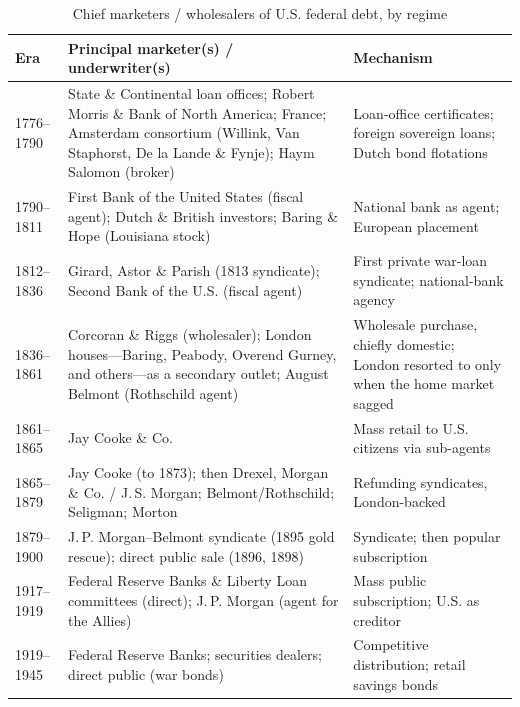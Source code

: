 \documentclass[12pt]{article}
\begin{document}
\begin{table}[htbp]
\centering
\caption{Chief marketers / wholesalers of U.S. federal debt, by regime}
\label{tab:marketers}
\small
\begin{tabular}{p{2.5cm} p{6.5cm} p{4.5cm}}
\toprule
Era & Principal marketer(s) / underwriter(s) & Mechanism \\
\midrule
1776--1790 & State \& Continental loan offices; Robert Morris \& Bank of North America; France; Amsterdam consortium (Willink, Van Staphorst, De la Lande \& Fynje); Haym Salomon (broker) & Loan-office certificates; foreign sovereign loans; Dutch bond flotations \\
1790--1811 & First Bank of the United States (fiscal agent); Dutch \& British investors; Baring \& Hope (Louisiana stock) & National bank as agent; European placement \\
1812--1836 & Girard, Astor \& Parish (1813 syndicate); Second Bank of the U.S. (fiscal agent) & First private war-loan syndicate; national-bank agency \\
1836--1861 & Corcoran \& Riggs (wholesaler); London houses---Baring, Peabody, Overend Gurney, and others---as a secondary outlet; August Belmont (Rothschild agent) & Wholesale purchase, chiefly domestic; London resorted to only when the home market sagged \\
1861--1865 & Jay Cooke \& Co. & Mass retail to U.S. citizens via sub-agents \\
1865--1879 & Jay Cooke (to 1873); then Drexel, Morgan \& Co. / J.\,S. Morgan; Belmont/Rothschild; Seligman; Morton & Refunding syndicates, London-backed \\
1879--1900 & J.\,P. Morgan--Belmont syndicate (1895 gold rescue); direct public sale (1896, 1898) & Syndicate; then popular subscription \\
1917--1919 & Federal Reserve Banks \& Liberty Loan committees (direct); J.\,P. Morgan (agent for the Allies) & Mass public subscription; U.S. as creditor \\
1919--1945 & Federal Reserve Banks; securities dealers; direct public (war bonds) & Competitive distribution; retail savings bonds \\
\bottomrule
\end{tabular}
\end{table}
\end{document}
